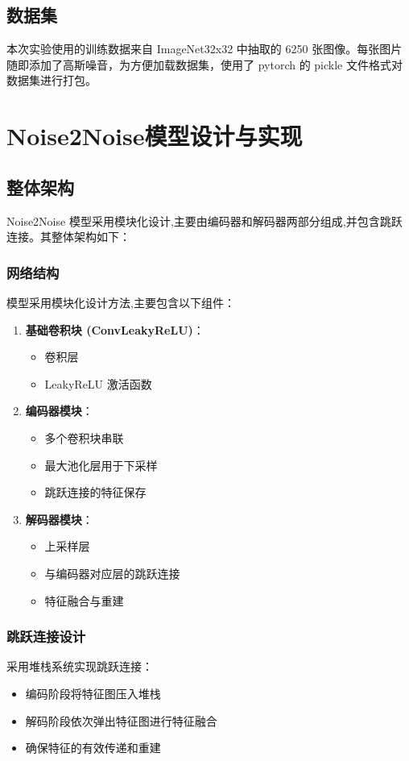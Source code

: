 \documentclass[UTF8]{ctexart}
\begin{document}
\subsection{数据集}

本次实验使用的训练数据来自 ImageNet32x32 中抽取的 6250 张图像。每张图片随即添加了高斯噪音，为方便加载数据集，使用了 pytorch 的 pickle 文件格式对数据集进行打包。

\section{Noise2Noise模型设计与实现}
\subsection{整体架构}

Noise2Noise 模型采用模块化设计,主要由编码器和解码器两部分组成,并包含跳跃连接。其整体架构如下：

\subsubsection{网络结构}
模型采用模块化设计方法,主要包含以下组件：
\begin{enumerate}
    \item \textbf{基础卷积块 (ConvLeakyReLU)}：
    \begin{itemize}
        \item 卷积层
        \item LeakyReLU 激活函数
    \end{itemize}
    \item \textbf{编码器模块}：
    \begin{itemize}
        \item 多个卷积块串联
        \item 最大池化层用于下采样
        \item 跳跃连接的特征保存
    \end{itemize}
    \item \textbf{解码器模块}：
    \begin{itemize}
        \item 上采样层
        \item 与编码器对应层的跳跃连接
        \item 特征融合与重建
    \end{itemize}
\end{enumerate}

\subsubsection{跳跃连接设计}
采用堆栈系统实现跳跃连接：
\begin{itemize}
    \item 编码阶段将特征图压入堆栈
    \item 解码阶段依次弹出特征图进行特征融合
    \item 确保特征的有效传递和重建
\end{itemize}
\end{document}
